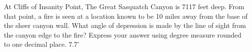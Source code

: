  {At Cliffs of Insanity Point, The Great Sasquatch Canyon is 7117 feet deep. From that point, a fire is seen at a location known to be 10 miles away from the base of the sheer canyon wall. What angle of depression is made by the line of sight from the canyon edge to the fire? Express your answer using degree measure rounded to one decimal place.}
{ $7.7^{\circ}$}
